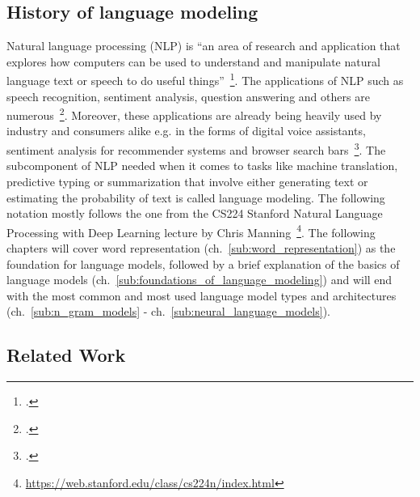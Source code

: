 \subsection{History of language modeling}
\label{sec:history_of_language_modeling}

Natural language processing (NLP) is “an area of research and application that explores how computers can be used to understand and manipulate natural language text or speech to do useful things”~\footcite[51]{doi:10.1002/aris.1440370103}. The applications of NLP such as speech recognition, sentiment analysis, question answering and others are numerous~\footcite{DBLP:journals/corr/GattK17}. Moreover, these applications are already being heavily used by industry and consumers alike e.g. in the forms of digital voice assistants, sentiment analysis for recommender systems and browser search bars~\footcite{8012330,10.1145/3064663.3064672,GoogleSearch}. The subcomponent of NLP needed when it comes to tasks like machine translation, predictive typing or summarization that involve either generating text or estimating the probability of text is called language modeling. The following notation mostly follows the one from the CS224 Stanford Natural Language Processing with Deep Learning lecture by Chris Manning~\footnote{\url{https://web.stanford.edu/class/cs224n/index.html}}. The following chapters will cover word representation (ch.~\ref{sub:word_representation}) as the foundation for language models, followed by a brief explanation of the basics of language models (ch.~\ref{sub:foundations_of_language_modeling}) and will end with the most common and most used language model types and architectures (ch.~\ref{sub:n_gram_models} - ch.~\ref{sub:neural_language_models}).















\subsection{Related Work}
\label{sec:related_work}

